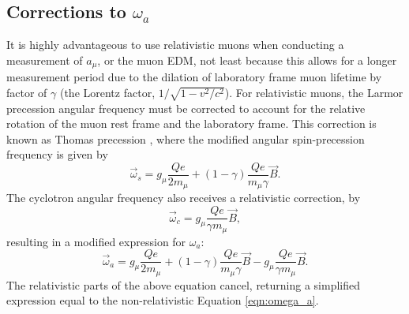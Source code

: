 \subsection{Corrections to $\omega_{a}$}\label{sec:OmegaACorrections}

It is highly advantageous to use relativistic muons when conducting a measurement of $a_{\mu}$, or the muon EDM, not least because this allows for a longer measurement period due to the dilation of laboratory frame muon lifetime by factor of $\gamma$ (the Lorentz factor, $1/\sqrt{1-v^{2}/c^{2}}$). For relativistic muons, the Larmor precession angular frequency must be corrected to account for the relative rotation of the muon rest frame and the laboratory frame. This correction is known as Thomas precession \cite{ThomasPrecession}, where the modified angular spin-precession frequency is given by
%
\begin{equation}
  \vec{\omega}_{s} = g_{\mu}\frac{Qe}{2m_{\mu}}+(1-\gamma)\frac{Qe}{m_{\mu}\gamma}\vec{B}.
  \label{eqn:ThomasPrecession}
\end{equation}
%
The cyclotron angular frequency also receives a relativistic correction, by
%
\begin{equation}
  \vec{\omega}_{c} = g_{\mu}\frac{Qe}{\gamma m_{\mu}}\vec{B},
  \label{eqn:RelativisticCycltron}
\end{equation}
%
resulting in a modified expression for $\omega_{a}$:
%
\begin{equation}
  \vec{\omega}_{a} = g_{\mu}\frac{Qe}{2m_{\mu}}+(1-\gamma)\frac{Qe}{m_{\mu}\gamma}\vec{B} - g_{\mu}\frac{Qe}{\gamma m_{\mu}}\vec{B}.
  \label{eqn:RelativisticOmegaA}
\end{equation}
%
The relativistic parts of the above equation cancel, returning a simplified expression equal to the non-relativistic Equation \ref{eqn:omega_a}. 

